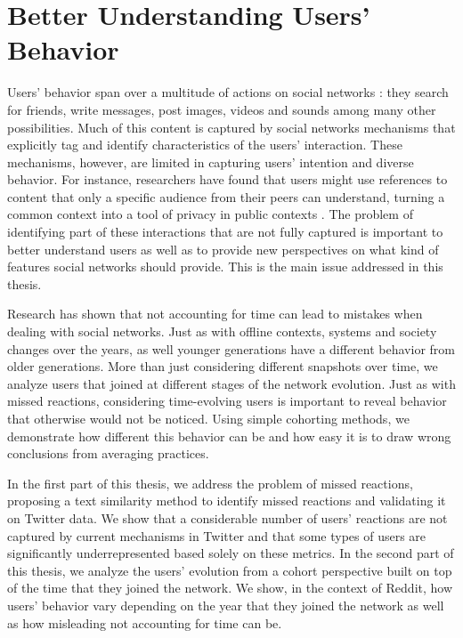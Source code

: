 \section{Better Understanding Users' Behavior}

Users' behavior span over a multitude of actions on social networks \cite{Benevenuto2009, Gilbert2009, Comarela2012}: they search for friends, write messages, post images, videos and sounds among many other possibilities. Much of this content is captured by social networks mechanisms that explicitly tag and identify characteristics of the users' interaction. These mechanisms, however, are limited in capturing users' intention and diverse behavior. For instance, researchers have found that users might use references to content that only a specific audience from their peers can understand, turning a common context into a tool of privacy in public contexts \cite{Boyd2011}. The problem of identifying part of these interactions that are not fully captured is important to better understand users as well as to provide new perspectives on what kind of features social networks should provide. This is the main issue addressed in this thesis.

Research has shown that not accounting for time can lead to mistakes when dealing with social networks. Just as with offline contexts, systems and society changes over the years, as well younger generations have a different behavior from older generations. More than just considering different snapshots over time, we analyze users that joined at different stages of the network evolution. Just as with missed reactions, considering time-evolving users is important to reveal behavior that otherwise would not be noticed. Using simple cohorting methods, we demonstrate how different this behavior can be and how easy it is to draw wrong conclusions from averaging practices.

In the first part of this thesis, we address the problem of missed reactions, proposing a text similarity method to identify missed reactions and validating it on Twitter data. We show that a considerable number of users' reactions are not captured by current mechanisms in Twitter and that some types of users are significantly underrepresented based solely on these metrics. In the second part of this thesis, we analyze the users' evolution from a cohort perspective built on top of the time that they joined the network. We show, in the context of Reddit, how users' behavior vary depending on the year that they joined the network as well as how misleading not accounting for time can be. 

